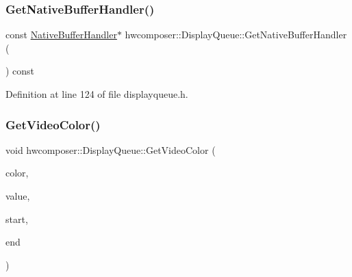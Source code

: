 \subsubsection{\texorpdfstring{Get\+Native\+Buffer\+Handler()}{GetNativeBufferHandler()}}
{\footnotesize\ttfamily const \mbox{\hyperlink{classhwcomposer_1_1NativeBufferHandler}{Native\+Buffer\+Handler}}$\ast$ hwcomposer\+::\+Display\+Queue\+::\+Get\+Native\+Buffer\+Handler (\begin{DoxyParamCaption}{ }\end{DoxyParamCaption}) const\hspace{0.3cm}{\ttfamily [inline]}}



Definition at line 124 of file displayqueue.\+h.


\begin{DoxyCode}{0}
\end{DoxyCode}
\mbox{\label{classhwcomposer_1_1DisplayQueue_a23e8d5eeba9ca1a1a9c1cbeef4825733}} 
\subsubsection{\texorpdfstring{Get\+Video\+Color()}{GetVideoColor()}}
{\footnotesize\ttfamily void hwcomposer\+::\+Display\+Queue\+::\+Get\+Video\+Color (\begin{DoxyParamCaption}\item[{H\+W\+C\+Color\+Control}]{color,  }\item[{float $\ast$}]{value,  }\item[{float $\ast$}]{start,  }\item[{float $\ast$}]{end }\end{DoxyParamCaption})}



